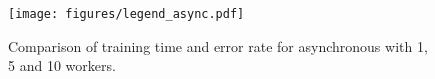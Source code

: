 \begin{figure}[ht]
\begin{center}
\texttt{[image: figures/legend\_async.pdf]}
\end{center}
\caption{Comparison of training time and error rate for asynchronous  with 1, 5 and 10 workers.}
\label{fig:async}
\end{figure}
